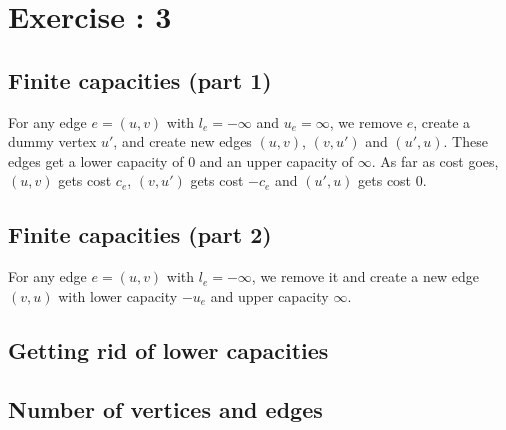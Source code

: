 
\section{Exercise : 3}

\subsection{Finite capacities (part 1)}
For any edge $e = (u, v)$ with $l_e = -\infty$ and $u_e = \infty$, we remove $e$, create a dummy vertex $u'$, and create new edges $(u, v)$, $(v, u')$ and $(u', u)$. These edges get a lower capacity of $0$ and an upper capacity of $\infty$. As far as cost goes, $(u, v)$ gets cost $c_e$, $(v, u')$ gets cost $-c_e$ and $(u', u)$ gets cost 0.

\subsection{Finite capacities (part 2)}
For any edge $e = (u, v)$ with $l_e = -\infty$, we remove it and create a new edge $(v, u)$ with lower capacity $-u_e$ and upper capacity $\infty$.

\subsection{Getting rid of lower capacities}


\subsection{Number of vertices and edges}
